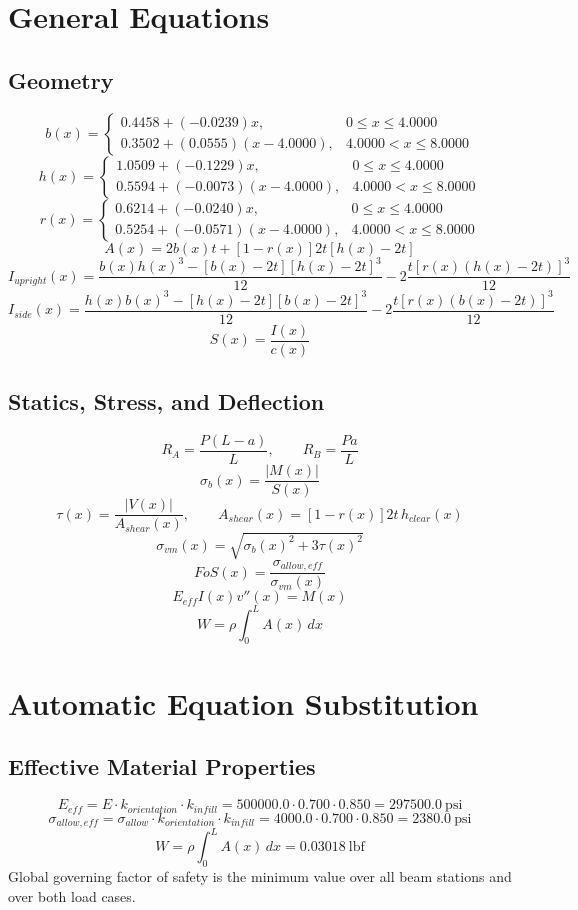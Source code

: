 \documentclass[11pt]{article}
\begin{document}
\section*{General Equations}
\subsection*{Geometry}
\[
b(x)=\begin{cases}0.4458 + (-0.0239)x, & 0 \le x \le 4.0000\\0.3502 + (0.0555)(x-4.0000), & 4.0000 < x \le 8.0000\end{cases}
\]
\[
h(x)=\begin{cases}1.0509 + (-0.1229)x, & 0 \le x \le 4.0000\\0.5594 + (-0.0073)(x-4.0000), & 4.0000 < x \le 8.0000\end{cases}
\]
\[
r(x)=\begin{cases}0.6214 + (-0.0240)x, & 0 \le x \le 4.0000\\0.5254 + (-0.0571)(x-4.0000), & 4.0000 < x \le 8.0000\end{cases}
\]
\[
A(x)=2b(x)t+[1-r(x)]2t[h(x)-2t]
\]
\[
I_{upright}(x)=\frac{b(x)h(x)^3-[b(x)-2t][h(x)-2t]^3}{12}-2\frac{t[r(x)(h(x)-2t)]^3}{12}
\]
\[
I_{side}(x)=\frac{h(x)b(x)^3-[h(x)-2t][b(x)-2t]^3}{12}-2\frac{t[r(x)(b(x)-2t)]^3}{12}
\]
\[
S(x)=\frac{I(x)}{c(x)}
\]

\subsection*{Statics, Stress, and Deflection}
\[
R_A=\frac{P(L-a)}{L}, \qquad R_B=\frac{Pa}{L}
\]
\[
\sigma_b(x)=\frac{|M(x)|}{S(x)}
\]
\[
\tau(x)=\frac{|V(x)|}{A_{shear}(x)}, \qquad A_{shear}(x)=[1-r(x)]2t\,h_{clear}(x)
\]
\[
\sigma_{vm}(x)=\sqrt{\sigma_b(x)^2+3\tau(x)^2}
\]
\[
FoS(x)=\frac{\sigma_{allow,eff}}{\sigma_{vm}(x)}
\]
\[
E_{eff}I(x)v''(x)=M(x)
\]
\[
W=\rho\int_0^L A(x)\,dx
\]

\section*{Automatic Equation Substitution}
\subsection*{Effective Material Properties}
\[E_{eff} = E \cdot k_{orientation} \cdot k_{infill} = 500000.0 \cdot 0.700 \cdot 0.850 = 297500.0\ \mathrm{psi}\]
\[\sigma_{allow,eff} = \sigma_{allow} \cdot k_{orientation} \cdot k_{infill} = 4000.0 \cdot 0.700 \cdot 0.850 = 2380.0\ \mathrm{psi}\]
\[W = \rho \int_0^L A(x)\,dx = 0.03018\ \mathrm{lbf}\]
Global governing factor of safety is the minimum value over all beam stations and over both load cases.
\end{document}
